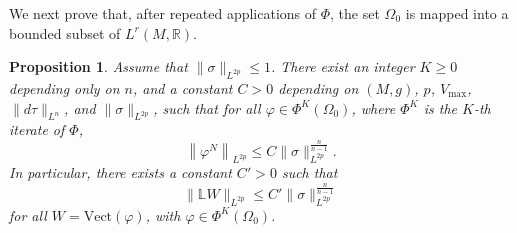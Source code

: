\documentclass[a4paper, 10pt, reqno]{amsart}
\theoremstyle{plain}
\newtheorem{proposition}[thm]{Proposition}
\theoremstyle{remark}
\theoremstyle{definition}
\renewcommand{\phi}{\varphi}
\newcommand{\bR}{\mathbb{R}}
\newcommand{\bL}{\mathbb{L}}
\begin{document}
We next prove that, after repeated applications of $\Phi$, the set $\Omega_0$
is mapped into a bounded subset of $L^r(M, \bR)$.

\begin{proposition}\label{propBootstrap}
	Assume that $\|\sigma\|_{L^{2p}} \leq 1$. There exist an integer $K \geq 0$
	depending only on $n$, and a constant $C > 0$ depending on $(M, g)$, $p$,
	$V_{\max}$, $\|d\tau\|_{L^n}$, and $\|\sigma\|_{L^{2p}}$, such that for all
	$\phi \in \Phi^K\left(\Omega_0\right)$, where $\Phi^K$ is the $K$-th iterate of $\Phi$,
	\[
		\left\|\phi^N\right\|_{L^{2p}} \leq C \|\sigma\|_{L^{2p}}^{\frac{n}{n-1}}.
	\]
	In particular, there exists a constant $C' > 0$ such that
	\[
		\|\bL W\|_{L^{2p}} \leq C' \|\sigma\|_{L^{2p}}^{\frac{n}{n-1}}
	\]
	for all $W = \mathrm{Vect}(\phi)$, with $\phi \in \Phi^K(\Omega_0)$.
\end{proposition}
\end{document}
